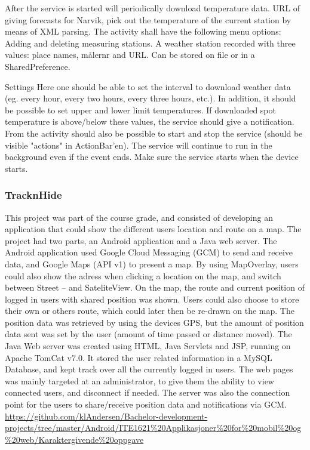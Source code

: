 After the service is started will periodically download temperature data. 
URL of giving forecasts for Narvik, pick out the temperature of the current station by means of XML parsing.
The activity shall have the following menu options:
Adding and deleting measuring stations. 
A weather station recorded with three values: place names, målernr and URL. 
Can be stored on file or in a SharedPreference.

Settings
Here one should be able to set the interval to download weather data (eg. every hour, every two hours, every three hours, etc.).
In addition, it should be possible to set upper and lower limit temperatures. 
If downloaded spot temperature is above/below these values, the service should give a notification.
From the activity should also be possible to start and stop the service (should be visible "actions" in ActionBar'en). 
The service will continue to run in the background even if the event ends. 
Make sure the service starts when the device starts.

\subsubsection{TracknHide}
\label{sec:tracknhide}
This project was part of the course grade, and consisted of developing an application that could show the different users location and route on a map. 
The project had two parts, an Android application and a Java web server.
\vspace{0.5em}\newline
The Android application used Google Cloud Messaging (GCM) to send and receive data, and Google Maps (API v1) to present a map. 
By using MapOverlay, users could also show the adress when clicking a location on the map, and switch between Street – and SateliteView. 
On the map, the route and current position of logged in users with shared position was shown. 
Users could also choose to store their own or others route, which could later then be re-drawn on the map. 
The position data was retrieved by using the devices GPS, but the amount of position data sent was set by the user (amount of time passed or distance moved).
\vspace{0.5em}\newline
The Java Web server was created using HTML, Java Servlets and JSP, running on Apache TomCat v7.0. 
It stored the user related information in a MySQL Database, and kept track over all the currently logged in users. 
The web pages was mainly targeted at an administrator, to give them the ability to view connected users, and disconnect if needed. 
The server was also the connection point for the users to share/receive position data and notifications via GCM.
 \url{https://github.com/klAndersen/Bachelor-development-projects/tree/master/Android/ITE1621%20Applikasjoner%20for%20mobil%20og%20web/Karaktergivende%20oppgave} 

